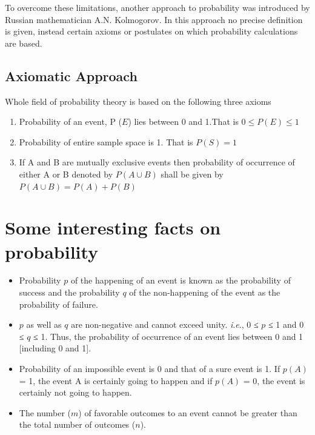 \documentclass[
]{book}
\begin{document}
To overcome these limitations, another approach to probability was
introduced by Russian mathematician A.N. Kolmogorov. In this approach no
precise definition is given, instead certain axioms or postulates on
which probability calculations are based.

\hypertarget{axiomatic-approach}{%
\subsection{Axiomatic Approach}\label{axiomatic-approach}}

Whole field of probability theory is based on the following three axioms

\begin{enumerate}
\def\labelenumi{\arabic{enumi}.}
\item
  Probability of an event, P (\(E\)) lies between 0 and 1.That is
  \(0 \leq P(E) \leq 1\)
\item
  Probability of entire sample space is 1. That is
  \(P\left( S \right) = 1\)
\item
  If A and B are mutually exclusive events then probability of occurrence of either A or B denoted by \(P(A \cup B)\) shall be given by \(P\left( A \cup B \right) = P\left( A \right) + P(B)\)
\end{enumerate}

\hypertarget{some-interesting-facts-on-probability}{%
\section*{Some interesting facts on probability}\label{some-interesting-facts-on-probability}}

\begin{itemize}
\item
  Probability \(p\) of the happening of an event is known as the probability of success and the probability \(q\) of the
  non-happening of the event as the probability of failure.
\item
  \(p\) as well as \(q\) are non-negative and cannot exceed unity. \emph{i}.\emph{e}., 0 ≤ \(p\) ≤ 1 and 0 ≤ \(q\) ≤ 1. Thus, the probability of occurrence of an event lies between 0 and 1 {[}including 0 and 1{]}.
\item
  Probability of an impossible event is 0 and that of a sure event is 1. If \(p(A)\) = 1, the event A is certainly going to happen and if \(p(A)\) = 0, the event is certainly not going to happen.
\item
  The number (\(m\)) of favorable outcomes to an event cannot be greater than the total number of outcomes (\(n\)).
\end{itemize}
\end{document}
